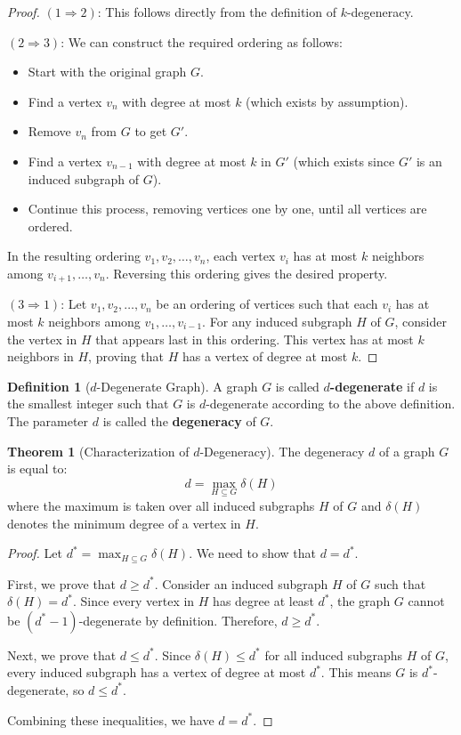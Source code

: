 \documentclass{article}
\theoremstyle{definition}
\newtheorem{theorem}{Theorem}
\newtheorem{definition}{Definition}
\begin{document}
\begin{proof}
$(1 \Rightarrow 2)$: This follows directly from the definition of $k$-degeneracy.

$(2 \Rightarrow 3)$: We can construct the required ordering as follows:
\begin{itemize}
    \item Start with the original graph $G$.
    \item Find a vertex $v_n$ with degree at most $k$ (which exists by assumption).
    \item Remove $v_n$ from $G$ to get $G'$.
    \item Find a vertex $v_{n-1}$ with degree at most $k$ in $G'$ (which exists since $G'$ is an induced subgraph of $G$).
    \item Continue this process, removing vertices one by one, until all vertices are ordered.
\end{itemize}

In the resulting ordering $v_1, v_2, \ldots, v_n$, each vertex $v_i$ has at most $k$ neighbors among $v_{i+1}, \ldots, v_n$. Reversing this ordering gives the desired property.

$(3 \Rightarrow 1)$: Let $v_1, v_2, \ldots, v_n$ be an ordering of vertices such that each $v_i$ has at most $k$ neighbors among $v_1, \ldots, v_{i-1}$. For any induced subgraph $H$ of $G$, consider the vertex in $H$ that appears last in this ordering. This vertex has at most $k$ neighbors in $H$, proving that $H$ has a vertex of degree at most $k$.
\end{proof}

\begin{definition}[$d$-Degenerate Graph]
A graph $G$ is called \textbf{$d$-degenerate} if $d$ is the smallest integer such that $G$ is $d$-degenerate according to the above definition. The parameter $d$ is called the \textbf{degeneracy} of $G$.
\end{definition}

\begin{theorem}[Characterization of $d$-Degeneracy]
The degeneracy $d$ of a graph $G$ is equal to:
\begin{equation}
d = \max_{H \subseteq G} \delta(H)
\end{equation}
where the maximum is taken over all induced subgraphs $H$ of $G$ and $\delta(H)$ denotes the minimum degree of a vertex in $H$.
\end{theorem}

\begin{proof}
Let $d^* = \max_{H \subseteq G} \delta(H)$. We need to show that $d = d^*$.

First, we prove that $d \geq d^*$. Consider an induced subgraph $H$ of $G$ such that $\delta(H) = d^*$. Since every vertex in $H$ has degree at least $d^*$, the graph $G$ cannot be $(d^*-1)$-degenerate by definition. Therefore, $d \geq d^*$.

Next, we prove that $d \leq d^*$. Since $\delta(H) \leq d^*$ for all induced subgraphs $H$ of $G$, every induced subgraph has a vertex of degree at most $d^*$. This means $G$ is $d^*$-degenerate, so $d \leq d^*$.

Combining these inequalities, we have $d = d^*$.
\end{proof}
\end{document}
